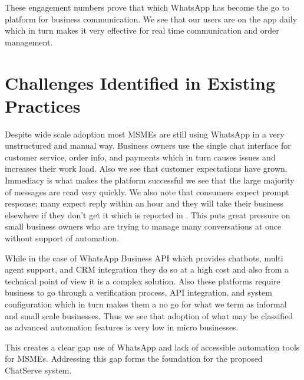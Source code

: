 These engagement numbers prove that which WhatsApp has become the go to platform for business communication. We see that our users are on the app daily which in turn makes it very effective for real time communication and order management.


\section{Challenges Identified in Existing Practices}

Despite wide scale adoption most MSMEs are still using WhatsApp in a very unstructured and manual way. Business owners use the single chat interface for customer service, order info, and payments which in turn causes issues and increases their work load. Also we see that customer expectations have grown. Immediacy is what makes the platform successful we see that the large majority of messages are read very quickly. We also note that consumers expect prompt response; many expect reply within an hour and they will take their business elsewhere if they don't get it which is reported in \cite{hyperleap_india2026}. This puts great pressure on small business owners who are trying to manage many conversations at once without support of automation.

While in the case of WhatsApp Business API which provides chatbots, multi agent support, and CRM integration they do so at a high cost and also from a technical point of view it is a complex solution. Also these platforms require business to go through a verification process, API integration, and system configuration which in turn makes them a no go for what we term as informal and small scale businesses. Thus we see that adoption of what may be classified as advanced automation features is very low in micro businesses.

This creates a clear gap use of WhatsApp and lack of accessible automation tools for MSMEs. Addressing this gap forms the foundation for the proposed ChatServe system.